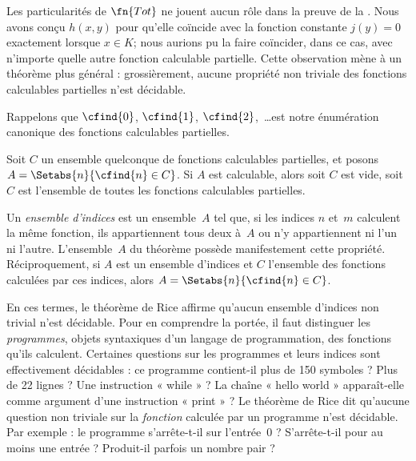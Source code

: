 \documentclass[../../../include/open-logic-section]{subfiles}
\begin{document}

Les particularités de $\fn{Tot}$ ne jouent aucun
rôle dans la preuve de la .
Nous avons conçu $h(x,y)$ pour qu'elle coïncide
avec la fonction constante $j(y)=0$ exactement
lorsque $x\in K$; nous aurions pu la faire
coïncider, dans ce cas, avec n'importe quelle
autre fonction calculable partielle. Cette
observation mène à un théorème plus général :
grossièrement, aucune propriété non triviale
des fonctions calculables partielles n'est décidable.

Rappelons que $\cfind{0}$, $\cfind{1}$,
$\cfind{2}$,~\dots est notre énumération
canonique des fonctions calculables partielles.

\begin{thm}
Soit $C$ un ensemble quelconque de fonctions
calculables partielles, et posons
$A=\Setabs{n}{\cfind{n}\in C}$.
Si $A$ est calculable, alors soit $C$ est vide,
soit $C$ est l'ensemble de toutes les fonctions
calculables partielles.
\end{thm}

Un \emph{ensemble d'indices} est un ensemble~$A$
tel que, si les indices $n$ et~$m$ calculent la
même fonction, ils appartiennent tous deux à~$A$
ou n'y appartiennent ni l'un ni l'autre.
L'ensemble~$A$ du théorème possède manifestement
cette propriété. Réciproquement, si $A$ est un
ensemble d'indices et $C$ l'ensemble des fonctions
calculées par ces indices, alors
$A=\Setabs{n}{\cfind{n}\in C}$.

\begin{explain}
En ces termes, le théorème de Rice affirme
qu'aucun ensemble d'indices non trivial n'est
décidable. Pour en comprendre la portée, il
faut distinguer les \emph{programmes}, objets
syntaxiques d'un langage de programmation, des
fonctions qu'ils calculent. Certaines questions
sur les programmes et leurs indices sont
effectivement décidables : ce programme contient-il
plus de 150 symboles ? Plus de 22 lignes ?
Une instruction « while » ? La chaîne
« hello world » apparaît-elle comme argument
d'une instruction « print » ? Le théorème de
Rice dit qu'aucune question non triviale sur la
\emph{fonction} calculée par un programme
n'est décidable. Par exemple : le programme
s'arrête-t-il sur l'entrée~$0$ ? S'arrête-t-il
pour au moins une entrée ? Produit-il parfois
un nombre pair ?
\end{explain}
\end{document}
